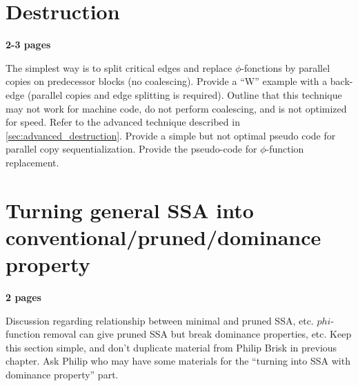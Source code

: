 \section{Destruction }
\label{sec:classical_destruction}
\textbf{2-3 pages}

The simplest way is to split critical edges and replace $\phi$-fonctions by parallel copies on predecessor blocks (no coalescing). Provide a ``W'' example with a back-edge (parallel copies and edge splitting is required). Outline that this technique may not work for machine code, do not perform coalescing, and is not optimized for speed. Refer to the advanced technique described in \ref{sec:advanced_destruction}. Provide a simple but not optimal pseudo code for parallel copy sequentialization. Provide the pseudo-code for $\phi$-function replacement.

\section{Turning general SSA into conventional/pruned/dominance property}
\textbf{2 pages}

Discussion regarding relationship between minimal and pruned SSA, etc.
$phi$-function removal can give pruned SSA but break
dominance properties, etc. Keep this section simple, and don't duplicate
material from Philip Brisk in previous chapter.
Ask Philip who may have some materials for the ``turning into SSA with dominance property'' part.

